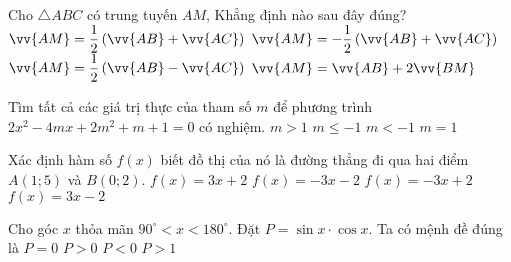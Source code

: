 \begin{ex}%
Cho $\triangle ABC$ có trung tuyến $AM$, Khẳng định nào sau đây đúng?
\choice
{\True $\vv{AM}=\dfrac{1}{2}\left(\vv{AB}+\vv{AC}\right)$}
{$\vv{AM}=-\dfrac{1}{2}\left(\vv{AB}+\vv{AC}\right)$}
{$\vv{AM}=\dfrac{1}{2}\left(\vv{AB}-\vv{AC}\right)$}
{$\vv{AM}=\vv{AB}+2\vv{BM}$}
\end{ex}

\begin{ex}%
Tìm tất cả các giá trị thực của tham số $m$ để phương trình $2x^2-4mx+2m^2+m+1=0$ có nghiệm.
\choice
{$m>1$}
{\True $m\le-1$}
{$m<-1$}
{$m=1$}
\end{ex}

\begin{ex}%
Xác định hàm số $f(x)$ biết đồ thị của nó là đường thẳng đi qua hai điểm $A(1;5)$ và $B(0;2)$.
\choice
{\True $f(x)=3x+2$}
{$f(x)=-3x-2$}
{$f(x)=-3x+2$}
{$f(x)=3x-2$}
\end{ex}

\begin{ex}%
Cho góc $x$ thỏa mãn $90^\circ<x<180^\circ$.  Đặt $P=\sin x\cdot \cos x$. Ta có mệnh đề đúng là
\choice
{$P=0$}
{$P>0$}
{\True $P<0$}
{$P>1$}
\end{ex}

